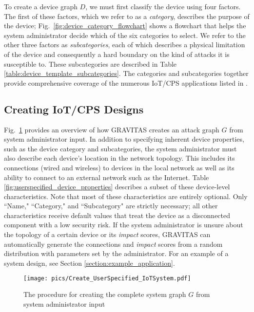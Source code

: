 \documentclass[10pt,journal,compsoc]{IEEEtran}
\begin{document}
\par To create a device graph $D$, we must first classify the device
using four factors. The first of these factors, which we refer to as a \textit{category}, 
describes the purpose of the device; Fig.~\ref{fig:device_category_flowchart} shows a flowchart
that helps the system administrator decide which of the six categories to select. We refer to the other three factors
as \textit{subcategories}, each of which describes a physical limitation of the device and
consequently a hard boundary on the kind of attacks it is susceptible to. These subcategories
are described in Table \ref{table:device_template_subcategories}. The categories and
subcategories together provide comprehensive coverage of the numerous IoT/CPS applications
listed in \cite{mosenia2017comprehensive}.


\subsection{Creating IoT/CPS Designs}
\label{section:create_userspecified_IoT_system}

Fig.~\ref{fig:create_IoT_system} provides an overview of how GRAVITAS creates an attack graph $G$ 
from system administrator input. In addition to specifying inherent device properties, such as the device category 
and subcategories, the system administrator must also describe each device's location in the network topology. This
includes its connections (wired and wireless) to devices in the local network as well as its ability 
to connect to an external network such as the Internet. Table
\ref{fig:userspecified_device_properties} describes a subset of these device-level
characteristics. Note that most of these characteristics are entirely optional. Only ``Name," ``Category," and ``Subcategory" are strictly necessary; all other characteristics receive default values that treat the device as a 
disconnected component with a low security risk. If the system administrator is unsure about the topology of a certain device or its \textit{impact} scores, GRAVITAS can automatically generate the connections and \textit{impact} scores from a random distribution with parameters set by the administrator. For an example of a system design, see 
Section \ref{section:example_application}.

\begin{figure}[h]
\centering
\texttt{[image: pics/Create\_UserSpecified\_IoTSystem.pdf]}
\caption{The procedure for creating the complete system graph $G$ from system administrator input} 
\label{fig:create_IoT_system}
\end{figure}
\end{document}
